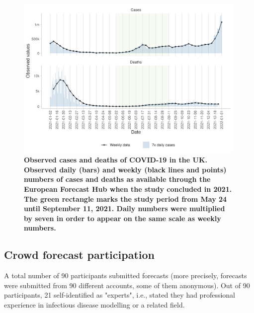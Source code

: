 \documentclass[10pt,a4paper,twocolumn]{article}
\begin{document}
\begin{figure}
\centering
\includegraphics[width=0.99\textwidth]{../output/figures/overview-data.png}
\caption{\bf{Observed cases and deaths of COVID-19 in the UK}. Observed daily (bars) and weekly (black lines and points) numbers of cases and deaths as available through the European Forecast Hub when the study concluded in 2021. The green rectangle marks the study period from May 24 until September 11, 2021. Daily numbers were multiplied by seven in order to appear on the same scale as weekly numbers.}
\label{fig:overview-data}
\end{figure}

\subsection*{Crowd forecast participation}

A total number of 90 participants submitted forecasts (more precisely, forecasts were submitted from 90 different accounts, some of them anonymous). Out of 90 participants, 21 self-identified as "experts", i.e., stated they had professional experience in infectious disease modelling or a related field. 
\end{document}

